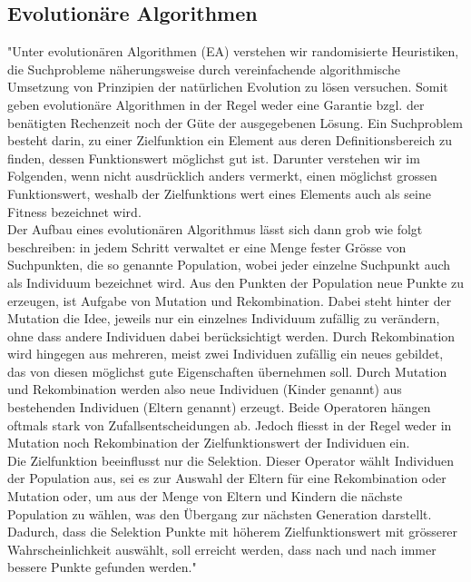 \subsection{Evolutionäre Algorithmen}
"Unter evolutionären Algorithmen (EA) verstehen wir randomisierte Heuristiken, die Suchprobleme näherungsweise durch vereinfachende algorithmische Umsetzung von
Prinzipien der natürlichen Evolution zu lösen versuchen. Somit geben evolutionäre Algorithmen in der Regel weder eine Garantie bzgl. der benätigten Rechenzeit noch der Güte der ausgegebenen Lösung. Ein Suchproblem besteht darin, zu einer Zielfunktion ein Element aus deren Definitionsbereich zu finden, dessen Funktionswert möglichst gut ist. Darunter verstehen wir im Folgenden, wenn nicht ausdrücklich anders vermerkt, einen möglichst grossen Funktionswert, weshalb der Zielfunktions wert eines Elements auch als seine Fitness bezeichnet wird.\\

Der Aufbau eines evolutionären Algorithmus lässt sich dann grob wie folgt beschreiben: in jedem Schritt verwaltet er eine Menge fester Grösse von Suchpunkten, die so genannte Population, wobei jeder einzelne Suchpunkt auch als Individuum bezeichnet wird. Aus den Punkten der Population neue Punkte zu erzeugen, ist Aufgabe von Mutation und Rekombination. Dabei steht hinter der Mutation die Idee, jeweils nur ein einzelnes Individuum zufällig zu verändern, ohne dass andere Individuen dabei berücksichtigt werden. Durch Rekombination wird hingegen aus mehreren, meist zwei Individuen zufällig ein neues gebildet, das von diesen möglichst gute Eigenschaften übernehmen soll. Durch Mutation und Rekombination werden also neue Individuen (Kinder genannt) aus bestehenden Individuen (Eltern genannt) erzeugt. Beide Operatoren hängen oftmals stark von Zufallsentscheidungen ab. Jedoch fliesst in der Regel weder in Mutation noch Rekombination der Zielfunktionswert der Individuen ein.\\

Die Zielfunktion beeinflusst nur die Selektion. Dieser Operator wählt Individuen der Population aus, sei es zur Auswahl der Eltern für eine Rekombination oder Mutation oder, um aus der Menge von Eltern und Kindern die nächste Population zu wählen, was den Übergang zur nächsten Generation darstellt. Dadurch, dass die Selektion Punkte mit höherem Zielfunktionswert mit grösserer Wahrscheinlichkeit auswählt, soll erreicht werden, dass nach und nach immer bessere Punkte gefunden werden." \cite{droste}


